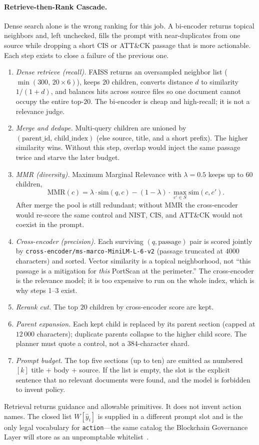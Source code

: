\paragraph{Retrieve-then-Rank Cascade.}
Dense search alone is the wrong ranking for this job. A bi-encoder returns topical neighbors and, left unchecked, fills the prompt with near-duplicates from one source while dropping a short CIS or ATT\&CK passage that is more actionable. Each step exists to close a failure of the previous one.
\begin{enumerate}
\item \emph{Dense retrieve (recall).} FAISS returns an oversampled neighbor list ($\min(300,\,20\times 6)$), keeps $20$ children, converts distance $d$ to similarity $1/(1+d)$, and balances hits across source files so one document cannot occupy the entire top-$20$. The bi-encoder is cheap and high-recall; it is not a relevance judge.
\item \emph{Merge and dedupe.} Multi-query children are unioned by $(\mathrm{parent\_id},\,\mathrm{child\_index})$ (else source, title, and a short prefix). The higher similarity wins. Without this step, overlap would inject the same passage twice and starve the later budget.
\item \emph{MMR (diversity).} Maximum Marginal Relevance with $\lambda=0.5$ keeps up to $60$ children,
\begin{equation}
\mathrm{MMR}(c)=\lambda\cdot\mathrm{sim}(q,c)-(1-\lambda)\cdot\max_{c'\in S}\mathrm{sim}(c,c').
\label{eq:mmr}
\end{equation}
After merge the pool is still redundant; without MMR the cross-encoder would re-score the same control and NIST, CIS, and ATT\&CK would not coexist in the prompt.
\item \emph{Cross-encoder (precision).} Each surviving $(q,\mathrm{passage})$ pair is scored jointly by \texttt{cross-encoder/ms-marco-MiniLM-L-6-v2} (passage truncated at $4000$ characters) and sorted. Vector similarity is a topical neighborhood, not ``this passage is a mitigation for \emph{this} PortScan at the perimeter.'' The cross-encoder is the relevance model; it is too expensive to run on the whole index, which is why steps 1--3 exist.
\item \emph{Rerank cut.} The top $20$ children by cross-encoder score are kept.
\item \emph{Parent expansion.} Each kept child is replaced by its parent section (capped at $12\,000$ characters); duplicate parents collapse to the higher child score. The planner must quote a control, not a $384$-character shard.
\item \emph{Prompt budget.} The top five sections (up to ten) are emitted as numbered $[k]$ title + body + source. If the list is empty, the slot is the explicit sentence that no relevant documents were found, and the model is forbidden to invent policy.
\end{enumerate}
Retrieval returns guidance and allowable primitives. It does not invent action names. The closed list $W[\hat{y}_i]$ is supplied in a different prompt slot and is the only legal vocabulary for \texttt{action}---the same catalog the Blockchain Governance Layer will store as an unpromptable whitelist~\cite{jan2025,karim2025}.

